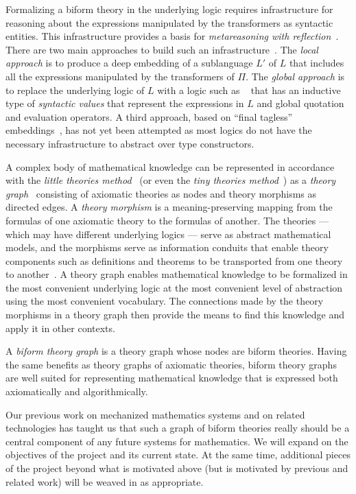 \documentclass[fleqn]{llncs}
\begin{document}
Formalizing a biform theory in the underlying logic requires
infrastructure for reasoning about the expressions manipulated by the
transformers as syntactic entities.  This infrastructure provides a
basis for \emph{metareasoning with reflection}~\cite{FarmerArxiv16}.
There are two main approaches to build such an
infrastructure~\cite{Farmer13}.  The \emph{local approach} is to
produce a deep embedding of a sublanguage $L'$ of $L$ that includes
all the expressions manipulated by the transformers of $\Pi$.  The
\emph{global approach} is to replace the underlying logic of $L$ with
a logic such as \churchqe~\cite{FarmerArxiv16} that has an inductive
type of \emph{syntactic values} that represent the expressions in $L$
and global quotation and evaluation operators.  A third approach,
based on ``final tagless'' embeddings~\cite{CaretteKS09}, has not yet
been attempted as most logics do not have the necessary infrastructure
to abstract over type constructors.

A complex body of mathematical knowledge can be represented in
accordance with the \emph{little theories method}~\cite{FarmerEtAl92b}
(or even the \emph{tiny theories method}~\cite{CaretteOConnorTPC})
as a \emph{theory graph}~\cite{Kohlhase14} consisting of axiomatic
theories as nodes and theory morphisms as directed edges.  A
\emph{theory morphism} is a meaning-preserving mapping from the
formulas of one axiomatic theory to the formulas of another.  The
theories --- which may have different underlying logics --- serve as
abstract mathematical models, and the morphisms serve as information
conduits that enable theory components such as definitions and
theorems to be transported from one theory to
another~\cite{BarwiseSeligman97}.  A theory graph enables mathematical
knowledge to be formalized in the most convenient underlying logic at
the most convenient level of abstraction using the most convenient
vocabulary.  The connections made by the theory morphisms in a theory
graph then provide the means to find this knowledge and apply it in
other contexts.

A \emph{biform theory graph} is a theory graph whose nodes are biform
theories. Having the same benefits as theory graphs of axiomatic
theories, biform theory graphs are well suited for representing
mathematical knowledge that is expressed both axiomatically and
algorithmically.
  
Our previous work on mechanized mathematics systems and on related
technologies has taught us that such a graph of biform theories 
really should be a central component of any future systems for
mathematics. We will expand on the objectives of the project and
its current state. At the same time, additional pieces of the project
beyond what is motivated above (but is motivated by previous and
related work) will be weaved in as appropriate.
\end{document}
